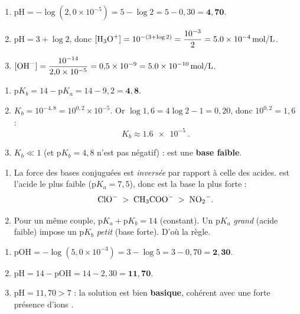 \documentclass[11pt,a4paper]{article}
\begin{document}

\begin{corrige}
\begin{enumerate}[label=\alph*)]
  \item $\mathrm{pH} = -\log(2{,}0\times10^{-5}) = 5 - \log 2 = 5 - 0{,}30 = \mathbf{4{,}70}$.
  \item $\mathrm{pH} = 3 + \log 2$, donc $[\ce{H3O+}] = 10^{-(3+\log 2)} = \dfrac{10^{-3}}{2} = \qty{5,0e-4}{mol\per L}$.
  \item $[\ce{OH-}] = \dfrac{10^{-14}}{2{,}0\times10^{-5}} = 0{,}5\times10^{-9} = \qty{5,0e-10}{mol\per L}$.
\end{enumerate}
\end{corrige}

\begin{corrige}
\begin{enumerate}[label=\alph*)]
  \item $\mathrm{p}K_b = 14 - \mathrm{p}K_a = 14 - 9{,}2 = \mathbf{4{,}8}$.
  \item $K_b = 10^{-4{,}8} = 10^{0{,}2}\times10^{-5}$. Or $\log 1{,}6 = 4\log 2 - 1 = 0{,}20$, donc $10^{0{,}2} = 1{,}6$ :
        \[ K_b \approx \qty{1,6e-5}{}. \]
  \item $K_b \ll 1$ (et $\mathrm{p}K_b = 4{,}8$ n'est pas négatif) :  est une \textbf{base faible}.
\end{enumerate}
\end{corrige}

\begin{corrige}
\begin{enumerate}[label=\alph*)]
  \item La force des bases conjuguées est \emph{inversée} par rapport à celle des acides.  est l'acide
        le plus faible ($\mathrm{p}K_a = 7{,}5$), donc  est la base la plus forte :
        \[ \ce{ClO-} \;>\; \ce{CH3COO-} \;>\; \ce{NO2-}. \]
  \item Pour un même couple, $\mathrm{p}K_a + \mathrm{p}K_b = 14$ (constant). Un $\mathrm{p}K_a$ \emph{grand}
        (acide faible) impose un $\mathrm{p}K_b$ \emph{petit} (base forte). D'où la règle.
\end{enumerate}
\end{corrige}

\begin{corrige}
\begin{enumerate}[label=\alph*)]
  \item $\mathrm{pOH} = -\log(5{,}0\times10^{-3}) = 3 - \log 5 = 3 - 0{,}70 = \mathbf{2{,}30}$.
  \item $\mathrm{pH} = 14 - \mathrm{pOH} = 14 - 2{,}30 = \mathbf{11{,}70}$.
  \item $\mathrm{pH} = 11{,}70 > 7$ : la solution est bien \textbf{basique}, cohérent avec une forte présence
        d'ions .
\end{enumerate}
\end{corrige}
\end{document}
